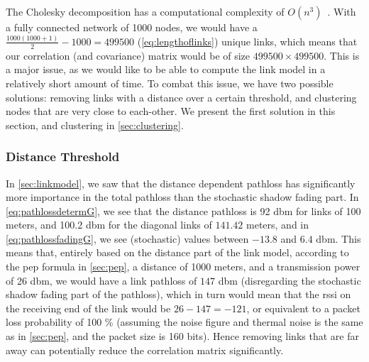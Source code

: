 The Cholesky decomposition has a computational complexity of $O(n^3)$~\citationneeded. With a fully connected network of 1000 nodes, we would have a $\frac{1000(1000+1)}{2} - 1000 = 499500$ (\autoref{eq:lengthoflinks}) unique links, which means that our correlation (and covariance) matrix would be of size $499500 \times 499500$. This is a major issue, as we would like to be able to compute the link model in a relatively short amount of time. To combat this issue, we have two possible solutions: removing links with a distance over a certain threshold, and clustering nodes that are very close to each-other. We present the first solution in this section, and clustering in \autoref{sec:clustering}.\medbreak

\subsubsection{Distance Threshold}\label{sec:distancethreshold}
In \autoref{sec:linkmodel}, we saw that the distance dependent \gls{pathloss} has significantly more importance in the total \gls{pathloss} than the stochastic shadow fading part. In \autoref{eq:pathlossdetermG}, we see that the distance \gls{pathloss} is 92 \acrshort{dbm} for links of 100 meters, and 100.2 \acrshort{dbm} for the diagonal links of $141.42$ meters, and in \autoref{eq:pathlossfadingG}, we see (stochastic) values between $-13.8$ and $6.4$ \acrshort{dbm}. This means that, entirely based on the distance part of the link model, according to the \gls{pep} formula in \autoref{sec:pep}, a distance of 1000 meters, and a transmission power of 26 \acrshort{dbm}, we would have a link \gls{pathloss} of $147$ \acrshort{dbm} (disregarding the stochastic shadow fading part of the \gls{pathloss}), which in turn would mean that the \gls{rssi} on the receiving end of the link would be $26 - 147 = -121$, or equivalent to a packet loss probability of 100 \% (assuming the noise figure and thermal noise is the same as in \autoref{sec:pep}, and the packet size is 160 bits). Hence removing links that are far away can potentially reduce the correlation matrix significantly.




